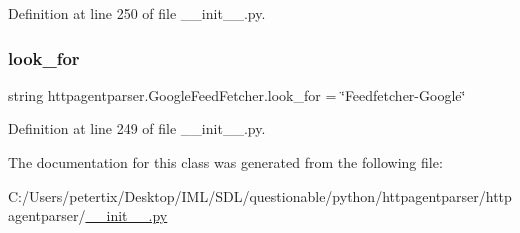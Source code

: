 Definition at line 250 of file \+\_\+\+\_\+init\+\_\+\+\_\+.\+py.

\hypertarget{classhttpagentparser_1_1_google_feed_fetcher_a1b368ba107d6124aacb5e92d0906756b}{}\label{classhttpagentparser_1_1_google_feed_fetcher_a1b368ba107d6124aacb5e92d0906756b} 
\subsubsection{\texorpdfstring{look\+\_\+for}{look\_for}}
{\footnotesize\ttfamily string httpagentparser.\+Google\+Feed\+Fetcher.\+look\+\_\+for = \char`\"{}Feedfetcher-\/Google\char`\"{}\hspace{0.3cm}{\ttfamily [static]}}



Definition at line 249 of file \+\_\+\+\_\+init\+\_\+\+\_\+.\+py.



The documentation for this class was generated from the following file\+:\begin{DoxyCompactItemize}
\item 
C\+:/\+Users/petertix/\+Desktop/\+I\+M\+L/\+S\+D\+L/questionable/python/httpagentparser/httpagentparser/\hyperlink{____init_____8py}{\+\_\+\+\_\+init\+\_\+\+\_\+.\+py}\end{DoxyCompactItemize}
